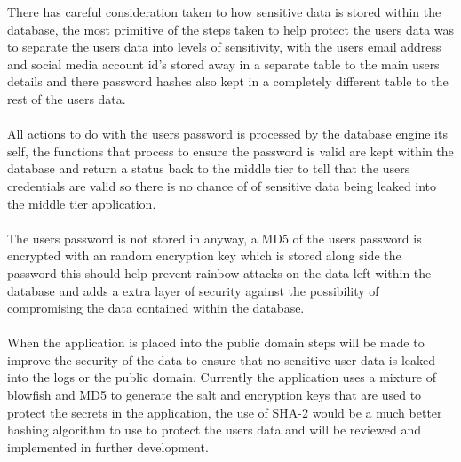 There has careful consideration taken to how sensitive data is stored within the database, the most primitive of the steps taken to help protect the users data was to separate the users data into levels of sensitivity, with the users email address and social media account id's stored away in a separate table to the main users details and there password hashes also kept in a completely different table to the rest of the users data.\\
\\
All actions to do with the users password is processed by the database engine its self, the functions that process to ensure the password is valid are kept within the database and return a status back to the middle tier to tell that the users credentials are valid so there is no chance of of sensitive data being leaked into the middle tier application.\\
\\
The users password is not stored in anyway, a MD5 of the users password is encrypted with an random encryption key which is stored along side the password this should help prevent rainbow attacks on the data left within the database and adds a extra layer of security against the possibility of compromising the data contained within the database.\\
\\
When the application is placed into the public domain steps will be made to improve the security of the data to ensure that no sensitive user data is leaked into the logs or the public domain. Currently the application uses a mixture of blowfish and MD5 to generate the salt and encryption keys that are used to protect the secrets in the application, the use of SHA-2 would be a much better hashing algorithm to use to protect the users data and will be reviewed and implemented in further development.


